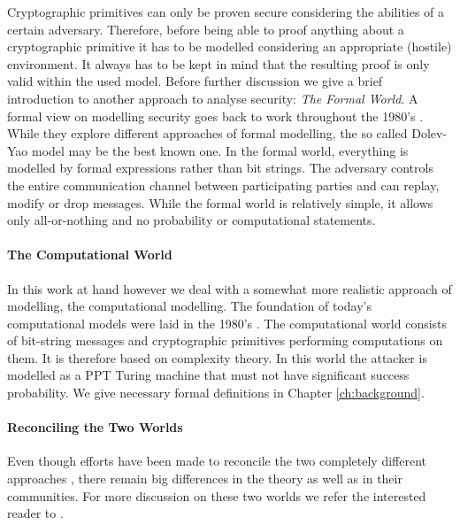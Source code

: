 Cryptographic primitives can only be proven secure considering the abilities of a certain adversary.
Therefore, before being able to proof anything about a cryptographic primitive it has to be modelled considering an appropriate (hostile) environment.
It always has to be kept in mind that the resulting proof is only valid within the used model.
Before further discussion we give a brief introduction to another approach to analyse security: \emph{The Formal World}.
A formal view on modelling security goes back to work throughout the 1980's \cite{DeMillo82,Dolev83,Millen87,Meadows91,Kemmerer1988,Burrows90}.
While they explore different approaches of formal modelling, the so called Dolev-Yao model \cite{Dolev83} may be the best known one.
In the formal world, everything is modelled by formal expressions rather than bit strings.
The adversary controls the entire communication channel between participating parties and can replay, modify or drop messages.
While the formal world is relatively simple, it allows only all-or-nothing  and no probability or computational statements.

\paragraph{The Computational World}
In this work at hand however we deal with a somewhat more realistic approach of modelling, the computational modelling.
The foundation of today's computational models were laid in the 1980's \cite{Goldwasser82,Goldwasser84,Yao82,Blum82}.
The computational world consists of bit-string messages and cryptographic primitives performing computations on them.
It is therefore based on complexity theory.
In this world the attacker is modelled as a \ac{PPT} Turing machine \cite{Turing37} that must not have significant success probability.
We give necessary formal definitions in Chapter \ref{ch:background}.

\paragraph{Reconciling the Two Worlds}
Even though efforts have been made to reconcile the two completely different approaches \cite{Abadi2002,Herzog2005}, there remain big differences in the theory as well as in their communities.
For more discussion on these two worlds we refer the interested reader to \cite{cortier2011survey}.

